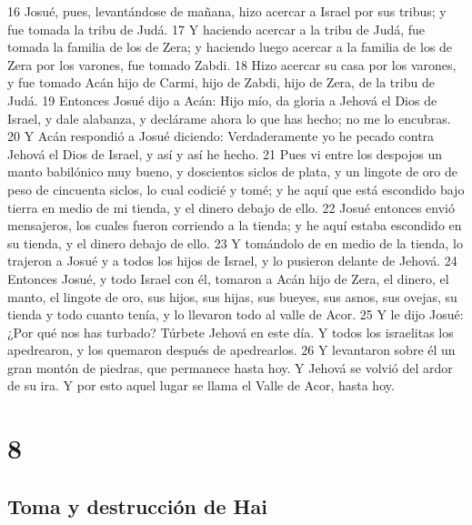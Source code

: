 16 Josué, pues, levantándose de mañana, hizo acercar a Israel por sus tribus; y fue tomada la tribu de Judá.
17 Y haciendo acercar a la tribu de Judá, fue tomada la familia de los de Zera; y haciendo luego acercar a la familia de los de Zera por los varones, fue tomado Zabdi.
18 Hizo acercar su casa por los varones, y fue tomado Acán hijo de Carmi, hijo de Zabdi, hijo de Zera, de la tribu de Judá.
19 Entonces Josué dijo a Acán: Hijo mío, da gloria a Jehová el Dios de Israel, y dale alabanza, y declárame ahora lo que has hecho; no me lo encubras.
20 Y Acán respondió a Josué diciendo: Verdaderamente yo he pecado contra Jehová el Dios de Israel, y así y así he hecho.
21 Pues vi entre los despojos un manto babilónico muy bueno, y doscientos siclos de plata,  y un lingote de oro de peso de cincuenta siclos, lo cual codicié y tomé; y he aquí que está escondido bajo tierra en medio de mi tienda, y el dinero debajo de ello.
22 Josué entonces envió mensajeros, los cuales fueron corriendo a la tienda; y he aquí estaba escondido en su tienda, y el dinero debajo de ello.
23 Y tomándolo de en medio de la tienda, lo trajeron a Josué y a todos los hijos de Israel, y lo pusieron delante de Jehová. 
24 Entonces Josué, y todo Israel con él, tomaron a Acán hijo de Zera, el dinero, el manto, el lingote de oro, sus hijos, sus hijas, sus bueyes, sus asnos, sus ovejas, su tienda y todo cuanto tenía, y lo llevaron todo al valle de Acor.
25 Y le dijo Josué: ¿Por qué nos has turbado? Túrbete Jehová en este día. Y todos los israelitas los apedrearon, y los quemaron después de apedrearlos.
26 Y levantaron sobre él un gran montón de piedras, que permanece hasta hoy. Y Jehová se volvió del ardor de su ira. Y por esto aquel lugar se llama el Valle de Acor, hasta hoy.

\chapter{8}

\section*{Toma y destrucción de Hai}

